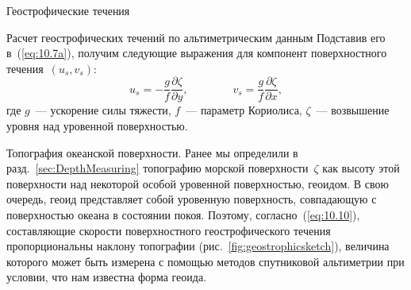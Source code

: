 \begin{chapter}{Геострофические течения}
\begin{section}{Расчет геострофических течений по альтиметрическим данным}
Подставив его в~(\ref{eq:10.7a}), получим следующие выражения для
компонент поверхностного течения~$(u_s, v_s)$:
\begin{equation}\label{eq:10.10}
 u_s =-\frac{g}{f}\frac{\partial\zeta}{\partial y}, \qquad \qquad
 v_s = \frac{g}{f}\frac{\partial\zeta}{\partial x},
\end{equation}
где $g$~--- ускорение силы тяжести, $f$~--- параметр Кориолиса, 
$\zeta$~--- возвышение уровня над уровенной поверхностью.
%

\begin{paragraph}{Топография океанской поверхности.}
%
Ранее мы определили в разд.~\ref{sec:DepthMeasuring} топографию морской 
поверхности~$\zeta$ как высоту этой поверхности над некоторой особой
уровенной поверхностью, геоидом.
В свою очередь, геоид представляет собой уровенную 
поверхность, совпадающую с поверхностью океана
в состоянии покоя. Поэтому, согласно~(\ref{eq:10.10}), составляющие скорости 
поверхностного геострофического течения пропорциональны наклону топографии
(рис.~\ref{fig:geostrophicsketch}), величина которого может быть измерена 
с помощью методов спутниковой альтиметрии при условии, что нам известна 
форма геоида.
%


\end{paragraph}
\end{section}
\end{chapter}
